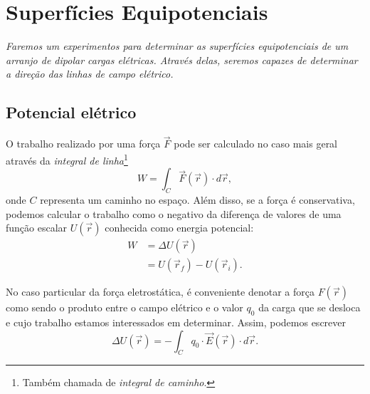 \chapter{Superfícies Equipotenciais} %
\label{Chap:SupEquip}        %

\begin{fullwidth}\it
	Faremos um experimentos para determinar as superfícies equipotenciais de um arranjo de dipolar cargas elétricas. Através delas, seremos capazes de determinar a direção das linhas de campo elétrico.
\end{fullwidth}

\section{Potencial elétrico}

O trabalho realizado por uma força $\vec{F}$ pode ser calculado no caso mais geral através da \emph{integral de linha}\footnote{Também chamada de \emph{integral de caminho}.}
\begin{equation}
    W = \int_C \vec{F}(\vec{r}) \cdot d\vec{r},
\end{equation}
%
onde $C$ representa um caminho no espaço. Além disso, se a força é conservativa, podemos calcular o trabalho como o negativo da diferença de valores de uma função escalar $U(\vec{r})$ conhecida como energia potencial:
\begin{align}
    W &= \Delta U(\vec{r}) \\
    &= U(\vec{r}_f) - U(\vec{r}_i).
\end{align}

No caso particular da força eletrostática, é conveniente denotar a força $F(\vec{r})$ como sendo o produto entre o campo elétrico e o valor $q_0$ da carga que se desloca e cujo trabalho estamos interessados em determinar. Assim, podemos escrever
\begin{equation}\label{Eq:EnergiaPotencialParaDeslEmCampoEletrico}
    \Delta U(\vec{r}) = - \int_C q_0 \cdot \vec{E}(\vec{r}) \cdot d\vec{r}.
\end{equation}

